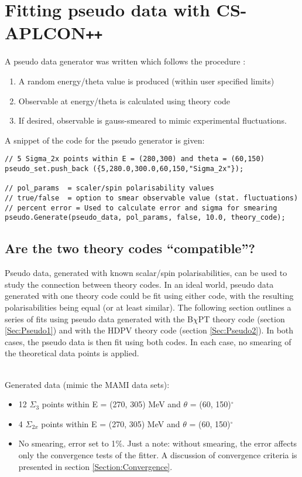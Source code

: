 \documentclass[]{article}
\begin{document}
\section{Fitting pseudo data with CS-APLCON\texttt{++}}

A pseudo data generator was written which follows the procedure :

\begin{enumerate}
	\item A random energy/theta value is produced (within user specified limits)
	\item Observable at energy/theta is calculated using theory code
	\item If desired, observable is gauss-smeared to mimic experimental fluctuations.
\end{enumerate}

\newpage
\noindent A snippet of the code for the pseudo generator is given:
\begin{lstlisting}
// 5 Sigma_2x points within E = (280,300) and theta = (60,150) 
pseudo_set.push_back ({5,280.0,300.0,60,150,"Sigma_2x"});

// pol_params  = scaler/spin polarisability values
// true/false  = option to smear observable value (stat. fluctuations)
// percent error = Used to calculate error and sigma for smearing
pseudo.Generate(pseudo_data, pol_params, false, 10.0, theory_code);

\end{lstlisting}

\subsection{Are the two theory codes \enquote{compatible}?}

Pseudo data, generated with known scalar/spin polarisabilities, can be used to study the connection between theory codes. In an ideal world, pseudo data generated with one theory code could be fit using either code, with the resulting polarisabilities being equal (or at least similar). The following section outlines a series of fits using pseudo data generated with the B$\chi$PT theory code (section \ref{Sec:Pseudo1}) and with the HDPV theory code (section \ref{Sec:Pseudo2}). In both cases, the pseudo data is then fit using both codes. In each case, no smearing of the theoretical data points is applied.

\noindent \\Generated data (mimic the MAMI data sets):
\begin{itemize}
	\item 12 $\Sigma_3$ points within E = (270, 305) MeV and $\theta$ = (60, 150)$^{\circ}$
	\item 4 $\Sigma_{2x}$ points within E = (270, 305) MeV and $\theta$ = (60, 150)$^{\circ}$
	\item No smearing, error set to 1$\%$. Just a note: without smearing, the error affects only the convergence tests of the fitter. A discussion of convergence criteria is presented in section \ref{Section:Convergence}.
\end{itemize}
\end{document}
